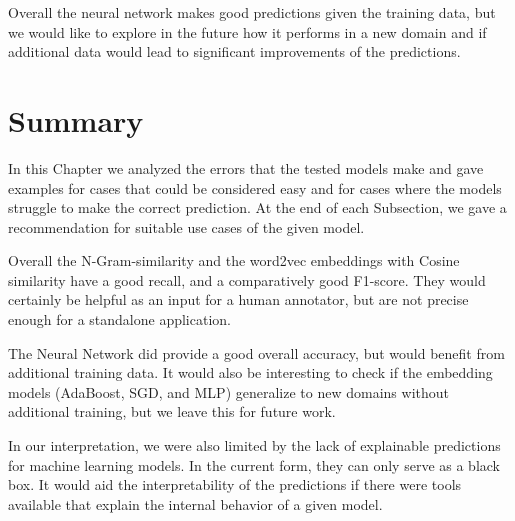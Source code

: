 Overall the neural network makes good predictions given the training data, but we would like to explore in the future
how it performs in a new domain and if additional data would lead to significant improvements of the predictions.

\section{Summary}

In this Chapter we analyzed the errors that the tested models make and gave examples for cases that could be considered
easy and for cases where the models struggle to make the correct prediction.
At the end of each Subsection, we gave a recommendation for suitable use cases of the given model.

Overall the N-Gram-similarity and the word2vec embeddings with Cosine similarity have a good recall, and a comparatively
good F1-score.
They would certainly be helpful as an input for a human annotator, but are not precise enough for a standalone application.

The Neural Network did provide a good overall accuracy, but would benefit from additional training data.
It would also be interesting to check if the embedding models (AdaBoost, SGD, and MLP) generalize to new domains
without additional training, but we leave this for future work.

In our interpretation, we were also limited by the lack of explainable predictions for machine learning models.
In the current form, they can only serve as a black box.
It would aid the interpretability of the predictions if there were tools available that explain the internal
behavior of a given model.
